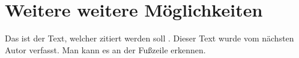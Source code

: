 \newpage
{}

\section{Weitere weitere Möglichkeiten}

Das ist der Text, welcher zitiert werden soll \autocite{htl-kaindorf:web}. Dieser Text wurde vom nächsten Autor verfasst. Man kann es an der Fußzeile erkennen.

